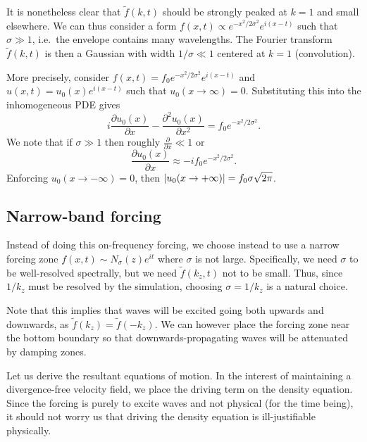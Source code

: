 \documentclass[11pt,
        usenames, %
        dvipsnames %
    ]{report}
\newcommand*{\pd}[2]{\frac{\partial#1}{\partial#2}}
\newcommand*{\ptd}[2]{\frac{\partial^2 #1}{\partial#2^2}}
\DeclarePairedDelimiter\abs{\lvert}{\rvert}
\begin{document}
It is nonetheless clear that $\tilde{f}(k, t)$ should be strongly peaked at $k =
1$ and small elsewhere. We can thus consider a form $f(x, t) \propto
e^{-x^2/2\sigma^2} e^{i(x - t)}$ such that $\sigma \gg 1$, i.e.\ the envelope
contains many wavelengths. The Fourier transform $\tilde{f}(k, t)$ is then a
Gaussian with width $1/\sigma \ll 1$ centered at $k = 1$ (convolution).

More precisely, consider $f(x, t) = f_0e^{-x^2/2\sigma^2} e^{i(x - t)}$ and $u(x,
t) = u_0(x)e^{i(x - t)}$ such that $u_0(x \to \infty) = 0$. Substituting this
into the inhomogeneous PDE gives
\begin{equation}
    i\pd{u_0(x)}{x} - \ptd{u_0(x)}{x} = f_0e^{-x^2/2\sigma^2}.
\end{equation}
We note that if $\sigma \gg 1$ then roughly $\pd{}{x} \ll 1$ or
\begin{equation}
    \pd{u_0(x)}{x} \approx -if_0e^{-x^2/2\sigma^2}.
\end{equation}
Enforcing $u_0(x \to -\infty) = 0$, then $\abs*{u_0(x \to +\infty)} =
f_0\sigma\sqrt{2\pi}$.

\subsection{Narrow-band forcing}

Instead of doing this on-frequency forcing, we choose instead to use a narrow
forcing zone $f(x, t) \sim N_{\sigma}(z)e^{it}$ where $\sigma$ is not large.
Specifically, we need $\sigma$ to be well-resolved spectrally, but we need
$\tilde{f}(k_z, t)$ not to be small. Thus, since $1/k_z$ must be resolved by the
simulation, choosing $\sigma = 1/k_z$ is a natural choice.

Note that this implies that waves will be excited going both upwards and
downwards, as $\tilde{f}(k_z) = \tilde{f}(-k_z)$. We can however place the
forcing zone near the bottom boundary so that downwards-propagating waves will
be attenuated by damping zones.

Let us derive the resultant equations of motion. In the interest of maintaining
a divergence-free velocity field, we place the driving term on the density
equation. Since the forcing is purely to excite waves and not physical (for the
time being), it should not worry us that driving the density equation is
ill-justifiable physically.
\end{document}
